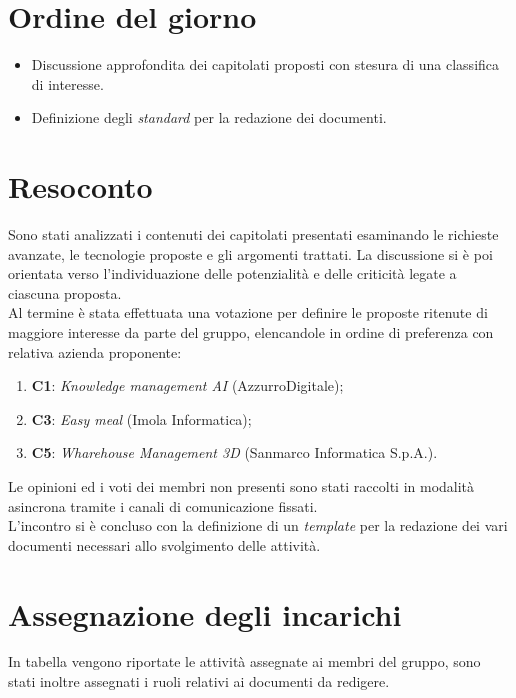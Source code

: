 \section{Ordine del giorno}
\begin{itemize}
    \item Discussione approfondita dei capitolati proposti con stesura di una classifica di interesse.
    \item Definizione degli \textit{standard} per la redazione dei documenti.
\end{itemize}

\section{Resoconto}
Sono stati analizzati i contenuti dei capitolati presentati esaminando le richieste avanzate, le tecnologie proposte e gli argomenti trattati.
La discussione si è poi orientata verso l'individuazione delle potenzialità e delle criticità legate a ciascuna proposta. \\
\noindent
Al termine è stata effettuata una votazione per definire le proposte ritenute di maggiore interesse da parte del gruppo, elencandole in ordine di preferenza con relativa azienda proponente:
\begin{enumerate}
    \item \textbf{C1}: \textit{Knowledge management AI} (AzzurroDigitale);
    \item \textbf{C3}: \textit{Easy meal} (Imola Informatica);
    \item \textbf{C5}: \textit{Wharehouse Management 3D} (Sanmarco Informatica S.p.A.).
\end{enumerate}
Le opinioni ed i voti dei membri non presenti sono stati raccolti in modalità asincrona tramite i canali di comunicazione fissati.\\
\noindent
L'incontro si è concluso con la definizione di un \textit{template} per la redazione dei vari documenti necessari allo svolgimento delle attività.

\section{Assegnazione degli incarichi}
In tabella vengono riportate le attività assegnate ai membri del gruppo, sono stati inoltre assegnati i ruoli relativi ai documenti da redigere.

